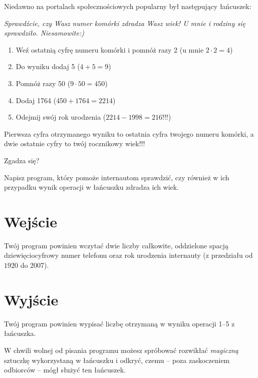 \documentclass{spiral-kurs}
\begin{document}
\makeheader
%
    Niedawno na portalach społecznościowych popularny był następujący łańcuszek:

    \medskip
    {\it
      \noindent
      Sprawdźcie, czy Wasz numer komórki zdradza Wasz wiek! U mnie i rodziny się sprawdziło. Niesamowite:)
      \begin{enumerate}
        \item Weź ostatnią cyfrę numeru komórki i pomnóż razy 2 (u mnie $2 \cdot 2=4$)
        \item Do wyniku dodaj 5 ($4+5=9$)
        \item Pomnóż razy 50 ($9 \cdot 50=450$)
        \item Dodaj 1764 ($450+1764=2214$)
        \item Odejmij swój rok urodzenia ($2214-1998=216$!!!)
      \end{enumerate}
      Pierwsza cyfra otrzymanego wyniku to ostatnia cyfra twojego numeru komórki, a dwie ostatnie cyfry to twój rocznikowy wiek!!!

      \medskip
      \noindent
      Zgadza się?
    }

    \medskip
    \noindent
    Napisz program, który pomoże internautom sprawdzić, czy również w ich przypadku
    wynik operacji w łańcuszku zdradza ich wiek.

    \section{Wejście}
    Twój program powinien wczytać dwie liczby całkowite, oddzielone spacją dziewięciocyfrowy numer telefonu
    oraz rok urodzenia internauty (z przedziału od $1920$ do $2007$).
      
    \section{Wyjście}
    Twój program powinien wypisać liczbę otrzymaną w wyniku operacji 1--5 z łańcuszka.

    
    \medskip
    \noindent
    W chwili wolnej od pisania programu możesz spróbować rozwikłać \emph{magiczną}
    sztuczkę wykorzystaną w łańcuszku i odkryć, czemu -- poza zaskoczeniem odbiorców
    -- mógł służyć ten łańcuszek.


  
\end{document}
